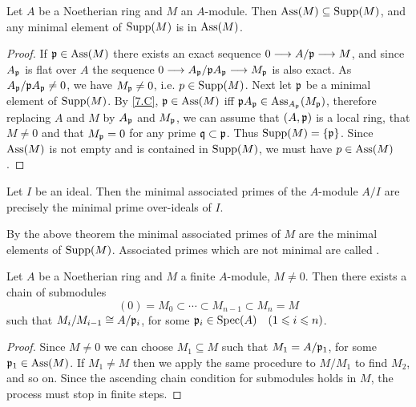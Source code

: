 \documentclass[../main]{subfiles}
\begin{document}
\begin{partheorem}\label{thm:009}
Let $A$ be a Noetherian ring and $M$ an $A$-module. Then $\operatorname{Ass}(M)\subseteq\operatorname{Supp}(M)$, and any minimal element
of $\operatorname{Supp}(M)$ is in $\operatorname{Ass}(M)$.
\end{partheorem}
\begin{proof}
If $\mathfrak{p}\in\operatorname{Ass}(M)$ there exists an exact sequence $0\longrightarrow A/\mathfrak{p}\longrightarrow M$, and since $A_{\mathfrak{p}}$ is flat over $A$ the sequence $0\longrightarrow A_{\mathfrak{p}}/\mathfrak{p}A_{\mathfrak{p}}\longrightarrow M_{\mathfrak{p}}$ is also exact. As $A_{\mathfrak{p}}/\mathfrak{p}A_{\mathfrak{p}}\neq0$, we have $M_{\mathfrak{p}}\neq0$, i.e. $p\in\operatorname{Supp}(M)$. Next let $\mathfrak{p}$ be a minimal element of $\operatorname{Supp}(M)$. By \ref{7.C}, $\mathfrak{p}\in\operatorname{Ass}(M)$ iff $\mathfrak{p}A_{\mathfrak{p}}\in\operatorname{Ass}_{A_{\mathfrak{p}}}(M_{\mathfrak{p}})$, therefore replacing $A$ and $M$ by $A_{\mathfrak{p}}$ and $M_{\mathfrak{p}}$, we can assume that $(A,\mathfrak{p})$ is a local ring, that $M\neq 0$ and that $M_{\mathfrak{p}}=0$ for any prime $\mathfrak{q}\subset\mathfrak{p}$. Thus $\operatorname{Supp}(M)=\{\mathfrak{p}\}$. Since $\operatorname{Ass}(M)$ is not empty and is contained in $\operatorname{Supp}(M)$, we must have $p\in\operatorname{Ass}(M)$.
\end{proof}

\begin{corollary}\label{cor:07.03}
Let $I$ be an ideal. Then the minimal associated primes of the $A$-module $A/I$ are precisely the minimal prime over-ideals of $I$.
\end{corollary}

\begin{remark}
By the above theorem the minimal associated primes of $M$ are the minimal elements of $\operatorname{Supp}(M)$. Associated primes which are not minimal are called .
\end{remark}

\begin{partheorem}\label{thm:010}
Let $A$ be a Noetherian ring and $M$ a finite $A$-module, $M\neq0$. Then there exists a chain of submodules \[(0)=M_0\subset\cdots\subset M_{n-1}\subset M_n=M\] such that $M_i/M_{i-1}\cong A/\mathfrak{p}_i$, for some $\ideal{p}_i\in\Spec(A)\for{1\leqslant i\leqslant n}$.
\end{partheorem}

\begin{proof}
Since $M\neq0$ we can choose $M_1\subseteq M$ such that $M_1=A/\mathfrak{p}_1$, for some $\mathfrak{p}_1\in\operatorname{Ass}(M)$. If $M_1\neq M$ then we apply the same procedure to $M/M_1$ to find $M_2$, and so on. Since the ascending chain condition for submodules holds in $M$, the process must stop in finite steps.
\end{proof}
\end{document}

